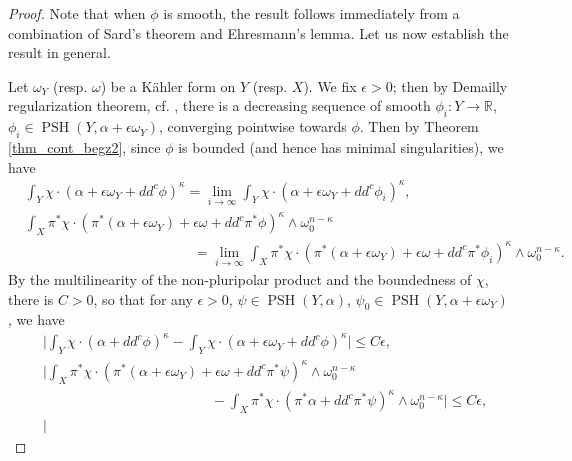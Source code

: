\documentclass[12pt]{article}
\numberwithin{equation}{section}
\theoremstyle{theorem}
\theoremstyle{definition}
\theoremstyle{remark}
\newcommand{\real}{\mathbb{R}}
\newcommand{\psh}{\operatorname{PSH}}
\begin{document}
	\begin{proof}
		Note that when $\phi$ is smooth, the result follows immediately from a combination of Sard's theorem and Ehresmann's lemma. 
		Let us now establish the result in general.
		\par 
		Let $\omega_Y$ (resp. $\omega$) be a K\"ahler form on $Y$ (resp. $X$).
		We fix $\epsilon > 0$; then by Demailly regularization theorem, cf. \cite{DemRegul}, there is a decreasing sequence of smooth $\phi_i : Y \to \real$, $\phi_i \in \psh(Y, \alpha + \epsilon \omega_Y)$, converging pointwise towards $\phi$.
		Then by Theorem \ref{thm_cont_begz2}, since $\phi$ is bounded (and hence has minimal singularities), we have
		\begin{equation}\label{eq_proj_2}
		\begin{aligned}
			&
			\int_Y \chi \cdot (\alpha + \epsilon \omega_Y + dd^c \phi)^{\kappa}
			=
			\lim_{i \to \infty} 
			\int_Y \chi \cdot (\alpha + \epsilon \omega_Y + dd^c \phi_i)^{\kappa},
			\\
			& \int_X \pi^* \chi \cdot (\pi^* (\alpha + \epsilon \omega_Y) + \epsilon \omega + dd^c \pi^* \phi)^{\kappa} \wedge \omega_0^{n - \kappa}
			\\
			&
			\qquad \qquad \qquad \qquad \qquad \qquad 
			=
			\lim_{i \to \infty} 
			\int_X \pi^* \chi \cdot (\pi^* (\alpha + \epsilon \omega_Y) + \epsilon \omega + dd^c \pi^* \phi_i)^{\kappa} \wedge \omega_0^{n - \kappa}.
		\end{aligned}
		\end{equation}
		By the multilinearity of the non-pluripolar product and the boundedness of $\chi$, there is $C > 0$, so that for any $\epsilon > 0$, $\psi \in \psh(Y, \alpha)$, $\psi_0 \in \psh(Y, \alpha + \epsilon \omega_Y)$,  we have
		\begin{equation}\label{eq_proj_4}	
		\begin{aligned}
			&
			\Big|
			\int_Y \chi \cdot (\alpha + dd^c \phi)^{\kappa}
			-
			\int_Y \chi \cdot (\alpha + \epsilon \omega_Y + dd^c \phi)^{\kappa}
			\Big|
			\leq 
			C \epsilon,
			\\
			&
			\Big|
			\int_X \pi^* \chi \cdot (\pi^* (\alpha + \epsilon \omega_Y) + \epsilon \omega + dd^c \pi^* \psi)^{\kappa} \wedge \omega_0^{n - \kappa}
			\\
			&
			\qquad \qquad \qquad \qquad \qquad \qquad 
			-
			\int_X \pi^* \chi \cdot (\pi^* \alpha + dd^c \pi^* \psi)^{\kappa} \wedge \omega_0^{n - \kappa}
			\Big|
			\leq 
			C \epsilon,
			\\
			&
			\Big|

\end{aligned}
\end{equation}
\end{proof}
\end{document}
